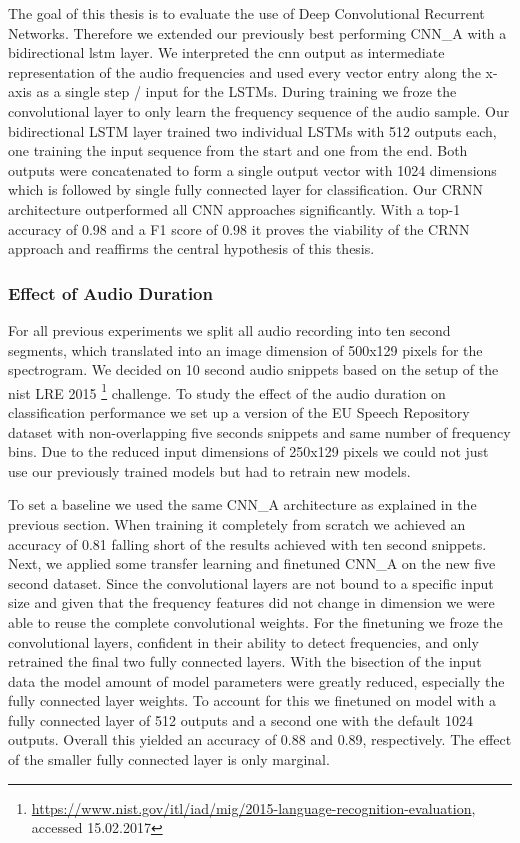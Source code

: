 The goal of this thesis is to evaluate the use of Deep Convolutional Recurrent Networks. Therefore we extended our previously best performing CNN\_A with a bidirectional \ac{lstm} layer. We interpreted the \ac{cnn} output as intermediate representation of the audio frequencies and used every vector entry along the x-axis as a single step / input for the LSTMs. During training we froze the convolutional layer to only learn the frequency sequence of the audio sample. Our bidirectional LSTM layer trained two individual LSTMs with 512 outputs each, one training the input sequence from the start and one from the end. Both outputs were concatenated to form a single output vector with  1024 dimensions which is followed by single fully connected layer for classification.
Our CRNN architecture outperformed all CNN approaches significantly. With a top-1 accuracy of 0.98 and a F1 score of 0.98 it proves the viability of the CRNN approach and reaffirms the central hypothesis of this thesis.



\subsubsection{Effect of Audio Duration} 
\label{sec:duration}
For all previous experiments we split all audio recording into ten second segments, which translated into an image dimension of 500x129 pixels for the spectrogram. We decided on 10 second audio snippets based on the setup of the \ac{nist} LRE 2015 \footnote{\url{https://www.nist.gov/itl/iad/mig/2015-language-recognition-evaluation}, accessed 15.02.2017} challenge. To study the effect of the audio duration on classification performance we set up a version of the EU Speech Repository dataset with non-overlapping five seconds snippets and same number of frequency bins. Due to the reduced input dimensions of 250x129 pixels we could not just use our previously trained models but had to retrain new models.

To set a baseline we used the same CNN\_A architecture as explained in the previous section. When training it completely from scratch we achieved an accuracy of 0.81 falling short of the results achieved with ten second snippets. Next, we applied some transfer learning and finetuned CNN\_A on the new five second dataset. Since the convolutional layers are not bound to a specific input size and given that the frequency features did not change in dimension we were able to reuse the complete  convolutional weights. For the finetuning we froze the convolutional layers, confident in their ability to detect frequencies, and only retrained the final two fully connected layers. With the bisection of the input data the model amount of model parameters were greatly reduced, especially the fully connected layer weights. To account for this we finetuned on model with a fully connected layer of 512 outputs and a second one with the default 1024 outputs. Overall this yielded an accuracy of 0.88 and 0.89, respectively. The effect of the smaller fully connected layer is only marginal. 

